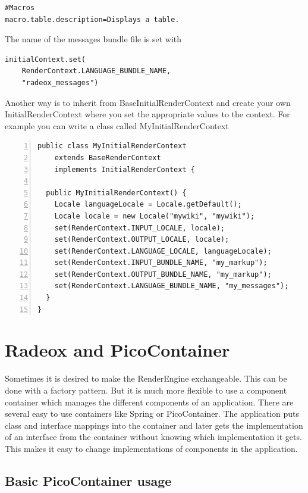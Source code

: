 \documentclass[a4paper,pdftex]{article}
\begin{document}
\begin{verbatim}
#Macros
macro.table.description=Displays a table.
\end{verbatim}

The name of the messages bundle file is set with

\begin{verbatim}
initialContext.set(
    RenderContext.LANGUAGE_BUNDLE_NAME, 
    "radeox_messages")
\end{verbatim}

Another way is to inherit from BaseInitialRenderContext and create your own
InitialRenderContext where you set the appropriate values to the context. For example you can 
write a class called MyInitialRenderContext

\begin{Verbatim}[gobble=0,frame=single,numbers=left,fontsize=\small]
public class MyInitialRenderContext
    extends BaseRenderContext
    implements InitialRenderContext {

  public MyInitialRenderContext() {
    Locale languageLocale = Locale.getDefault();
    Locale locale = new Locale("mywiki", "mywiki");
    set(RenderContext.INPUT_LOCALE, locale);
    set(RenderContext.OUTPUT_LOCALE, locale);
    set(RenderContext.LANGUAGE_LOCALE, languageLocale);
    set(RenderContext.INPUT_BUNDLE_NAME, "my_markup");
    set(RenderContext.OUTPUT_BUNDLE_NAME, "my_markup");
    set(RenderContext.LANGUAGE_BUNDLE_NAME, "my_messages");
  }
}
\end{Verbatim}

\section{Radeox and PicoContainer}

Sometimes it is desired to make the RenderEngine exchangeable. This can be done with a factory pattern.
But it is much more flexible to use a component container which manages the different components
of an application. There are several easy to use containers like Spring\cite{Spring} or PicoContainer\cite{PicoContainer}. The 
application puts class and interface mappings into the container and later gets the
implementation of an interface from the container without knowing which implementation
it gets. This makes it easy to change implementations of components in the application.

\subsection{Basic PicoContainer usage}
\end{document}

